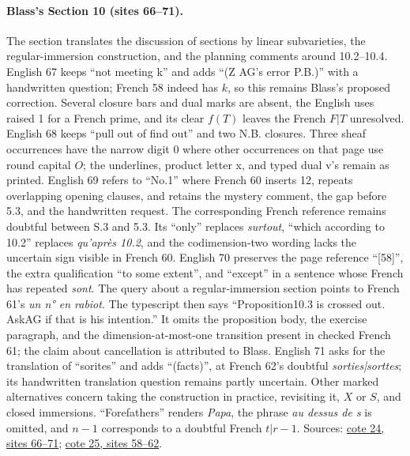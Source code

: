 \paragraph{Blass's Section 10 (sites 66--71).}
The section translates the discussion of sections by linear subvarieties, the regular-immersion construction, and the planning comments around 10.2--10.4. English 67 keeps ``not meeting k'' and adds ``(Z AG's error P.B.)'' with a handwritten question; French 58 indeed has $k$, so this remains Blass's proposed correction. Several closure bars and dual marks are absent, the English uses raised 1 for a French prime, and its clear $f(T)$ leaves the French $F|T$ unresolved. English 68 keeps ``pull out of find out'' and two N.B. closures. Three sheaf occurrences have the narrow digit $0$ where other occurrences on that page use round capital $O$; the underlines, product letter x, and typed dual v's remain as printed. English 69 refers to ``No.1'' where French 60 inserts 12, repeats overlapping opening clauses, and retains the mystery comment, the gap before 5.3, and the handwritten request. The corresponding French reference remains doubtful between S.3 and 5.3. Its ``only'' replaces \emph{surtout}, ``which according to 10.2'' replaces \emph{qu'après 10.2}, and the codimension-two wording lacks the uncertain sign visible in French 60. English 70 preserves the page reference ``[58]'', the extra qualification ``to some extent'', and ``except'' in a sentence whose French has repeated \emph{sont}. The query about a regular-immersion section points to French 61's \emph{un n° en rabiot}. The typescript then says ``Proposition10.3 is crossed out. AskAG if that is his intention.'' It omits the proposition body, the exercise paragraph, and the dimension-at-most-one transition present in checked French 61; the claim about cancellation is attributed to Blass. English 71 asks for the translation of ``sorites'' and adds ``(facts)'', at French 62's doubtful \emph{sorties|sorttes}; its handwritten translation question remains partly uncertain. Other marked alternatives concern taking the construction in practice, revisiting it, $X$ or $S$, and closed immersions. ``Forefathers'' renders \emph{Papa}, the phrase \emph{au dessus de s} is omitted, and $n-1$ corresponds to a doubtful French $t|r-1$. Sources: \href{https://grothendieck.umontpellier.fr/web/viewer.html?file=../24.pdf\#page=67}{cote 24, sites 66--71}; \href{https://grothendieck.umontpellier.fr/web/viewer.html?file=../25.pdf\#page=59}{cote 25, sites 58--62}.

